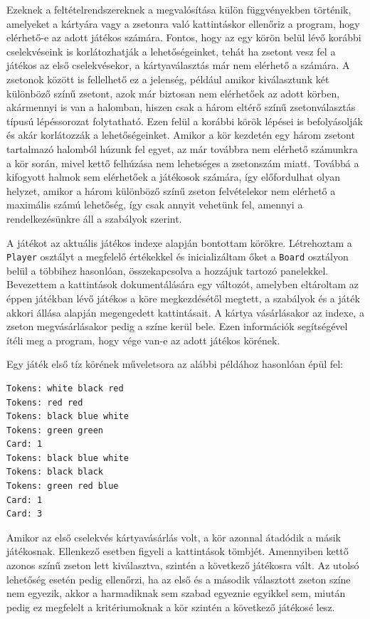 Ezeknek a feltételrendszereknek a megvalósítása külön függvényekben történik, amelyeket a kártyára vagy a zsetonra való kattintáskor ellenőriz a program, hogy elérhető-e az adott játékos számára. Fontos, hogy az egy körön belül lévő korábbi cselekvéseink is korlátozhatják a lehetőségeinket, tehát ha zsetont vesz fel a játékos az első cselekvésekor, a kártyaválasztás már nem elérhető a számára. A zsetonok között is fellelhető ez a jelenség, például amikor kiválasztunk két különböző színű zsetont, azok már biztosan nem elérhetőek az adott körben, akármennyi is van a halomban, hiszen csak a három eltérő színű zsetonválasztás típusú lépéssorozat folytatható. Ezen felül a korábbi körök lépései is befolyásolják és akár korlátozzák a lehetőségeinket. Amikor a kör kezdetén egy három zsetont tartalmazó halomból húzunk fel egyet, az már továbbra nem elérhető számunkra a kör során, mivel kettő felhúzása nem lehetséges a zsetonszám miatt. Továbbá a kifogyott halmok sem elérhetőek a játékosok számára, így előfordulhat olyan helyzet, amikor a három különböző színű zseton felvételekor nem elérhető a maximális számú lehetőség, így csak annyit vehetünk fel, amennyi a rendelkezésünkre áll a szabályok szerint.


A játékot az aktuális játékos indexe alapján bontottam körökre. Létrehoztam a \texttt{Player} osztályt a megfelelő értékekkel és inicializáltam őket a \texttt{Board} osztályon belül a többihez hasonlóan, összekapcsolva a hozzájuk tartozó panelekkel. Bevezettem a kattintások dokumentálására egy változót, amelyben eltároltam az éppen játékban lévő játékos a köre megkezdésétől megtett, a szabályok és a játék akkori állása alapján megengedett kattintásait. A kártya vásárlásakor az indexe, a zseton megvásárlásakor pedig a színe kerül bele. Ezen információk segítségével ítéli meg a program, hogy vége van-e az adott játékos körének.

Egy játék első tíz körének műveletsora az alábbi példához hasonlóan épül fel:
\begin{verbatim}
Tokens: white black red 
Tokens: red red 
Tokens: black blue white 
Tokens: green green 
Card: 1 
Tokens: black blue white 
Tokens: black black 
Tokens: green red blue 
Card: 1 
Card: 3 
\end{verbatim}

Amikor az első cselekvés kártyavásárlás volt, a kör azonnal átadódik a másik játékosnak. Ellenkező esetben figyeli a kattintások tömbjét. Amennyiben kettő azonos színű zseton lett kiválasztva, szintén a következő játékosra vált. Az utolsó lehetőség esetén pedig ellenőrzi, ha az első és a második választott zseton színe nem egyezik, akkor a harmadiknak sem szabad egyeznie egyikkel sem, miután pedig ez megfelelt a kritériumoknak a kör szintén a következő játékosé lesz.

